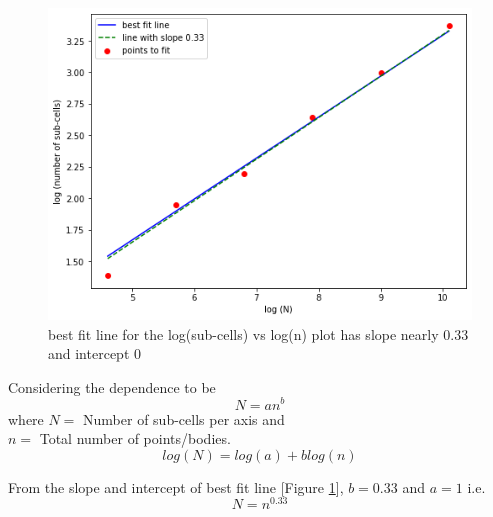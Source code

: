 \documentclass[twocolumn,11pt]{article}
\begin{document}
\begin{figure}[h]
\centering
	\includegraphics[width=\linewidth]{subcellfit}
	\caption{\small{best fit line for the log(sub-cells) vs log(n) plot has slope nearly 0.33 and intercept 0}}
	\label{fig12}
\end{figure}

Considering the dependence to be
\begin{equation} N = an^b \end{equation}
where \(N=\) Number of sub-cells per axis and \\ \(n=\) Total number of points/bodies.
\begin{equation} log(N) = log(a) + blog(n) \end{equation}

From the slope and intercept of best fit line [Figure \ref{fig12}], \(b=0.33\) and \(a=1\) i.e.
\begin{equation} N = n^{0.33} \end{equation}
\end{document}

